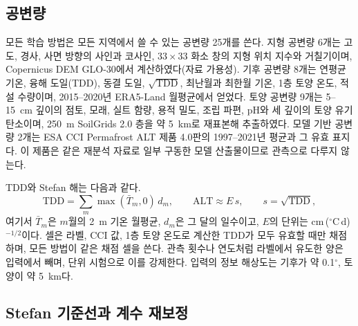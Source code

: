 \subsection{공변량}\label{sec:m-covariates}

모든 학습 방법은 모든 지역에서 쓸 수 있는 공변량 25개를 쓴다. 지형 공변량 6개는 고도, 경사, 사면 방향의 사인과 코사인, $33 \times 33$ 화소 창의 지형 위치 지수와 거칠기이며, Copernicus DEM GLO-30에서 계산하였다(자료 가용성). 기후 공변량 8개는 연평균 기온, 융해 도일(TDD), 동결 도일, $\sqrt{\mathrm{TDD}}$, 최난월과 최한월 기온, 1층 토양 온도, 적설 수량이며, 2015--2020년 ERA5-Land 월평균에서 얻었다\cite{munozsabater2021_era5_land}. 토양 공변량 9개는 5--15~cm 깊이의 점토, 모래, 실트 함량, 용적 밀도, 조립 파편, pH와 세 깊이의 토양 유기탄소이며, 250~m SoilGrids 2.0 층\cite{Poggio2021}을 약 5~km로 재표본해 추출하였다. 모델 기반 공변량 2개는 ESA CCI Permafrost ALT 제품 4.0판의 1997--2021년 평균과 그 유효 표지다\cite{Westermann2024}. 이 제품은 같은 재분석 자료로 일부 구동한 모델 산출물이므로 관측으로 다루지 않는다.

TDD와 Stefan 해\cite{Stefan1891}는 다음과 같다.
\begin{equation}
\mathrm{TDD} = \sum_{m} \max(\bar{T}_m, 0)\, d_m, \qquad \mathrm{ALT} \approx E\, s, \qquad s = \sqrt{\mathrm{TDD}},
\label{eq:stefan}
\end{equation}
여기서 $\bar{T}_m$은 $m$월의 2~m 기온 월평균, $d_m$은 그 달의 일수이고, $E$의 단위는 cm\,($^{\circ}$C\,d)$^{-1/2}$이다. 셀은 라벨, CCI 값, 1층 토양 온도로 계산한 TDD가 모두 유효할 때만 채점하며, 모든 방법이 같은 채점 셀을 쓴다. 관측 횟수나 연도처럼 라벨에서 유도한 양은 입력에서 빼며, 단위 시험으로 이를 강제한다. 입력의 정보 해상도는 기후가 약 0.1$^{\circ}$, 토양이 약 5~km다.

\subsection{Stefan 기준선과 계수 재보정}\label{sec:m-stefan}

